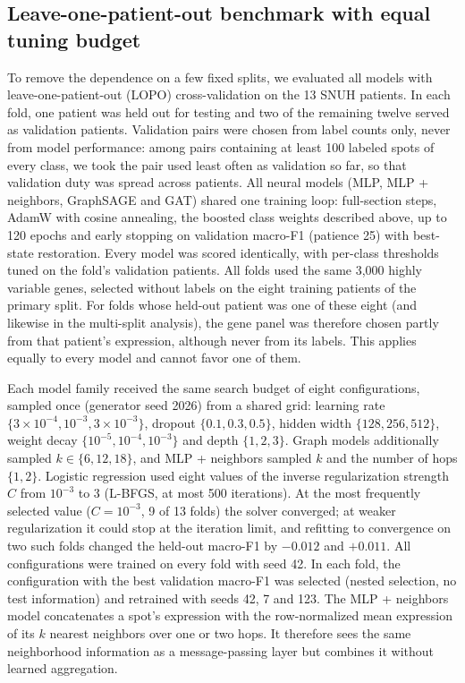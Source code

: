 \documentclass[11pt,letterpaper]{article}
\begin{document}
\subsection{Leave-one-patient-out benchmark with equal tuning budget}

To remove the dependence on a few fixed splits, we evaluated all models with leave-one-patient-out (LOPO) cross-validation on the 13 SNUH patients. In each fold, one patient was held out for testing and two of the remaining twelve served as validation patients. Validation pairs were chosen from label counts only, never from model performance: among pairs containing at least 100 labeled spots of every class, we took the pair used least often as validation so far, so that validation duty was spread across patients. All neural models (MLP, MLP + neighbors, GraphSAGE and GAT) shared one training loop: full-section steps, AdamW with cosine annealing, the boosted class weights described above, up to 120 epochs and early stopping on validation macro-F1 (patience 25) with best-state restoration. Every model was scored identically, with per-class thresholds tuned on the fold's validation patients. All folds used the same 3{,}000 highly variable genes, selected without labels on the eight training patients of the primary split. For folds whose held-out patient was one of these eight (and likewise in the multi-split analysis), the gene panel was therefore chosen partly from that patient's expression, although never from its labels. This applies equally to every model and cannot favor one of them.

Each model family received the same search budget of eight configurations, sampled once (generator seed 2026) from a shared grid: learning rate $\{3 \times 10^{-4}, 10^{-3}, 3 \times 10^{-3}\}$, dropout $\{0.1, 0.3, 0.5\}$, hidden width $\{128, 256, 512\}$, weight decay $\{10^{-5}, 10^{-4}, 10^{-3}\}$ and depth $\{1, 2, 3\}$. Graph models additionally sampled $k \in \{6, 12, 18\}$, and MLP + neighbors sampled $k$ and the number of hops $\{1, 2\}$. Logistic regression used eight values of the inverse regularization strength $C$ from $10^{-3}$ to 3 (L-BFGS, at most 500 iterations). At the most frequently selected value ($C = 10^{-3}$, 9 of 13 folds) the solver converged; at weaker regularization it could stop at the iteration limit, and refitting to convergence on two such folds changed the held-out macro-F1 by $-0.012$ and $+0.011$. All configurations were trained on every fold with seed 42. In each fold, the configuration with the best validation macro-F1 was selected (nested selection, no test information) and retrained with seeds 42, 7 and 123. The MLP + neighbors model concatenates a spot's expression with the row-normalized mean expression of its $k$ nearest neighbors over one or two hops. It therefore sees the same neighborhood information as a message-passing layer but combines it without learned aggregation.
\end{document}
